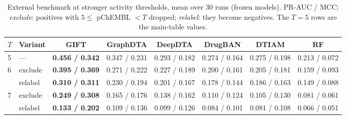 \documentclass[11pt,letterpaper]{article}
\begin{document}
\begin{table}[!t]
\centering
\caption{External benchmark at stronger activity thresholds, mean over 30 runs (frozen models). PR-AUC / MCC; \emph{exclude}: positives with $5\leq$ pChEMBL $<T$ dropped; \emph{relabel}: they become negatives. The $T=5$ rows are the main-table values.}
\label{tab:thresholds}
\small
\setlength{\tabcolsep}{3.5pt}
\begin{tabular}{llcccccc}
\toprule
\textbf{$T$} & \textbf{Variant} & \textbf{GIFT} & \textbf{GraphDTA} & \textbf{DeepDTA} & \textbf{DrugBAN} & \textbf{DTIAM} & \textbf{RF} \\
\midrule
5 & --- & \textbf{0.456 / 0.342} & 0.347 / 0.231 & 0.293 / 0.182 & 0.274 / 0.164 & 0.275 / 0.198 & 0.213 / 0.072 \\
\midrule
\multirow{2}{*}{6} & exclude & \textbf{0.395 / 0.369} & 0.271 / 0.222 & 0.227 / 0.189 & 0.200 / 0.161 & 0.205 / 0.181 & 0.159 / 0.093 \\
 & relabel & \textbf{0.310 / 0.311} & 0.230 / 0.194 & 0.201 / 0.167 & 0.178 / 0.144 & 0.186 / 0.163 & 0.149 / 0.088 \\
\midrule
\multirow{2}{*}{7} & exclude & \textbf{0.249 / 0.308} & 0.165 / 0.176 & 0.138 / 0.162 & 0.110 / 0.124 & 0.105 / 0.130 & 0.081 / 0.061 \\
 & relabel & \textbf{0.133 / 0.202} & 0.109 / 0.136 & 0.099 / 0.126 & 0.084 / 0.101 & 0.081 / 0.108 & 0.066 / 0.051 \\
\bottomrule
\end{tabular}
\end{table}
\end{document}
